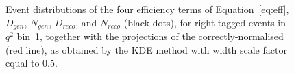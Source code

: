 \begin{figure}[hbt]
    \caption{Event distributions of the four efficiency terms of Equation~\ref{eq:eff}, $D_{gen}$, $N_{gen}$, $D_{reco}$, and $N_{reco}$ (black dots), for right-tagged events in $q^2$ bin~1, together with the projections of the correctly-normalised \pdfs (red line), as obtained by the KDE method with width scale factor equal to $0.5$.}
    \label{fig:NDKde1}
\end{figure}








